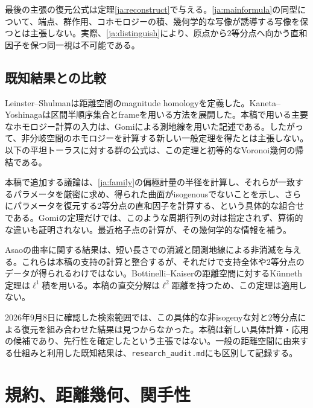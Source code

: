 \documentclass[12pt]{amsart}
\theoremstyle{definition}
\theoremstyle{remark}
\numberwithin{equation}{section}
\begin{document}
最後の主張の復元公式は定理\ref{ja:reconstruct}で与える。\eqref{ja:mainformula}の同型について、端点、群作用、コホモロジーの積、幾何学的な写像が誘導する写像を保つとは主張しない。実際、\eqref{ja:distinguish}により、原点から2等分点へ向かう直和因子を保つ同一視は不可能である。

\subsection{既知結果との比較}
Leinster--Shulmanは距離空間のmagnitude homologyを定義した\cite[Definitions 3.3--3.4]{ja:LS}。Kaneta--Yoshinagaは区間半順序集合とframeを用いる方法を展開した\cite{ja:KY}。本稿で用いる主要なホモロジー計算の入力は、Gomiによる測地線を用いた記述\cite[Corollary 3.15 and Theorem 5.22]{ja:G}である。したがって、非分岐空間のホモロジーを計算する新しい一般定理を得たとは主張しない。以下の平坦トーラスに対する群の公式は、この定理と初等的なVoronoi幾何の帰結である。

本稿で追加する議論は、\eqref{ja:family}の偏極計量の半径を計算し、それらが一致するパラメータを厳密に求め、得られた曲面がisogenousでないことを示し、さらにパラメータを復元する2等分点の直和因子を計算する、という具体的な組合せである。Gomiの定理だけでは、このような周期行列の対は指定されず、算術的な違いも証明されない。最近格子点の計算が、その幾何学的な情報を補う。

Asaoの曲率に関する結果は、短い長さでの消滅と閉測地線による非消滅を与える\cite[Corollaries 4.6, 6.5 and Theorem 5.3]{ja:Asao}。これらは本稿の支持の計算と整合するが、それだけで支持全体や2等分点のデータが得られるわけではない。Bottinelli--Kaiserの距離空間に対するK\"unneth定理は$\ell^1$積を用いる\cite[Proposition 3.1]{ja:BK}。本稿の直交分解は$\ell^2$距離を持つため、この定理は適用しない。

2026年9月8日に確認した検索範囲では、この具体的な非isogenyな対と2等分点による復元を組み合わせた結果は見つからなかった。本稿は新しい具体計算・応用の候補であり、先行性を確定したという主張ではない。一般の距離空間に由来する仕組みと利用した既知結果は、\texttt{research\_audit.md}にも区別して記録する。

\section{規約、距離幾何、関手性}
\end{document}
